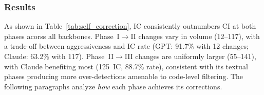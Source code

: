 \documentclass[sigconf, review, anonymous]{acmart}
\begin{document}
    \subsubsection{Results}
    \label{sec:rq5_results}

\begin{table}[!t]
\centering
\caption{Label change statistics per phase per backbone. IC = corrections (Incorrect$\to$Correct), CI = regressions (Correct$\to$Incorrect). Percentages are relative to total label changes at each phase.}
\label{tab:self_correction}
\setlength{\tabcolsep}{3pt}
\small
{}
\end{table}

    As shown in Table~\ref{tab:self_correction}, IC consistently outnumbers CI at both phases acorss all backbones. Phase~I$\to$II changes vary in volume (12--117), with a trade-off between aggressiveness and IC rate (GPT: 91.7\% with 12 changes; Claude: 63.2\% with 117). Phase~II$\to$III changes are uniformly larger (55--141), with Claude benefiting most (125~IC, 88.7\% rate), consistent with its textual phases producing more over-detections amenable to code-level filtering. The following paragraphs analyze \emph{how} each phase achieves its corrections.
\end{document}
